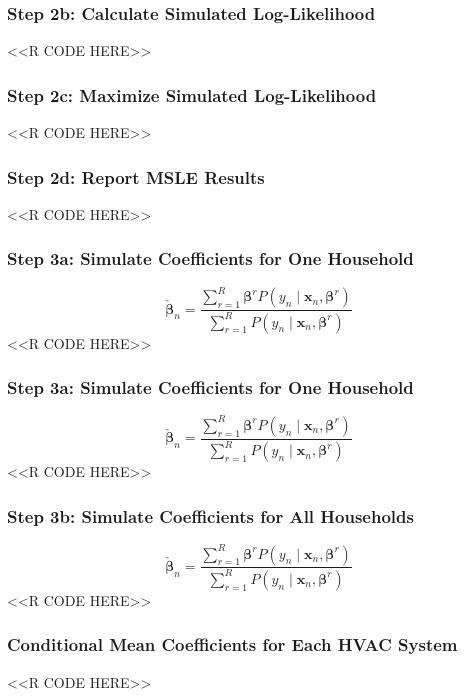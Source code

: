\documentclass{beamer}
\begin{document}
\begin{frame}[fragile]\frametitle{Step 2b: Calculate Simulated Log-Likelihood}
    <<R CODE HERE>>
\end{frame}

\begin{frame}[fragile]\frametitle{Step 2c: Maximize Simulated Log-Likelihood}
    <<R CODE HERE>>
\end{frame}

\begin{frame}[fragile]\frametitle{Step 2d: Report MSLE Results}
    <<R CODE HERE>>
\end{frame}

\begin{frame}[fragile]\frametitle{Step 3a: Simulate Coefficients for One Household}
    $$\check{\bm{\beta}}_n = \frac{\sum_{r = 1}^R \bm{\beta}^r P(y_n \mid \bm{x}_n, \bm{\beta}^r)}{\sum_{r = 1}^R P(y_n \mid \bm{x}_n, \bm{\beta}^r)}$$
    <<R CODE HERE>>
\end{frame}

\begin{frame}[fragile]\frametitle{Step 3a: Simulate Coefficients for One Household}
    $$\check{\bm{\beta}}_n = \frac{\sum_{r = 1}^R \bm{\beta}^r P(y_n \mid \bm{x}_n, \bm{\beta}^r)}{\sum_{r = 1}^R P(y_n \mid \bm{x}_n, \bm{\beta}^r)}$$
    <<R CODE HERE>>
\end{frame}

\begin{frame}[fragile]\frametitle{Step 3b: Simulate Coefficients for All Households}
    $$\check{\bm{\beta}}_n = \frac{\sum_{r = 1}^R \bm{\beta}^r P(y_n \mid \bm{x}_n, \bm{\beta}^r)}{\sum_{r = 1}^R P(y_n \mid \bm{x}_n, \bm{\beta}^r)}$$
    <<R CODE HERE>>
\end{frame}

\begin{frame}[fragile]\frametitle{Conditional Mean Coefficients for Each HVAC System}
    <<R CODE HERE>>
\end{frame}
\end{document}
